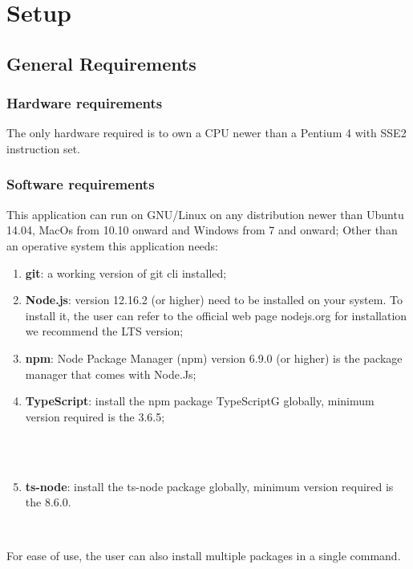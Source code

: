 \section{Setup}
\subsection{General Requirements}
\subsubsection{Hardware requirements}
The only hardware required is to own a CPU newer than a Pentium 4 with SSE2 instruction set.
\subsubsection{Software requirements}
This application can run on GNU/Linux on any distribution newer than Ubuntu 14.04, MacOs from 10.10 onward and Windows from 7 and onward;
Other than an operative system this application needs:
\begin{enumerate}
	\item \textbf{git}: a working version of git cli installed;
    \item \textbf{Node.js}: version 12.16.2 (or higher) need to be installed on your system. To install it, the user can refer to the official web page nodejs.org for installation we recommend the LTS version;
    \item \textbf{npm}: Node Package Manager (npm) version 6.9.0 (or higher) is the package manager that comes with Node.Js;
    \item \textbf{TypeScript}: install the npm package TypeScriptG globally, minimum version required is the 3.6.5;\\\\ \centerline{}\\
    \item \textbf{ts-node}: install the ts-node package globally, minimum version required is the 8.6.0. \newline\newline \centerline{}\\
\end{enumerate}
For ease of use, the user can also install multiple packages in a single command.
\begin{center}
\end{center}

